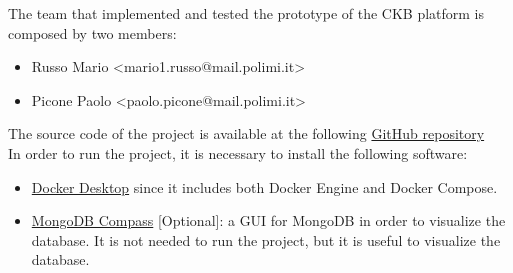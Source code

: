 \setcounter{page}{2}


\newpage
{}
\tableofcontents
\newpage
{}
\listoffigures
{}
\listoftables

\clearpage
The team that implemented and tested the prototype of the CKB platform is composed by two members:
\begin{itemize}
        \item Russo Mario <mario1.russo@mail.polimi.it>
        \item Picone Paolo <paolo.picone@mail.polimi.it>
\end{itemize}

The source code of the project is available at the following \href{https://github.com/piconepaolo/PiconeRusso/tree/main/ITD/Code}{GitHub repository} \\
In order to run the project, it is necessary to install the following software:
\begin{itemize}
        \item \href{https://www.docker.com/products/docker-desktop/}{Docker Desktop} since it includes both Docker Engine and Docker Compose.
        \item \href{https://www.mongodb.com/products/tools/compass}{MongoDB Compass} [Optional]: a GUI for MongoDB in order to visualize the database. It is not needed to run the project, but it is useful to visualize the database.
\end{itemize}

